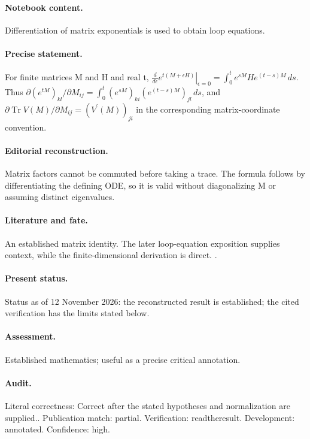 \paragraph{Notebook content.} Differentiation of matrix exponentials is used to obtain loop equations.

\paragraph{Precise statement.} For finite matrices M and H and real t, $\left.\frac{d}{d\epsilon}e^{t(M+\epsilon H)}\right|_{\epsilon=0}=\int_0^t e^{sM}He^{(t-s)M}\,ds$. Thus $\partial(e^{tM})_{kl}/\partial M_{ij}=\int_0^t(e^{sM})_{ki}(e^{(t-s)M})_{jl}\,ds$, and $\partial\operatorname{Tr}V(M)/\partial M_{ij}=(V^{\prime}(M))_{ji}$ in the corresponding matrix-coordinate convention.

\paragraph{Editorial reconstruction.} Matrix factors cannot be commuted before taking a trace. The formula follows by differentiating the defining ODE, so it is valid without diagonalizing M or assuming distinct eigenvalues.

\paragraph{Literature and fate.} An established matrix identity. The later loop-equation exposition supplies context, while the finite-dimensional derivation is direct. \citep{makeenko2000large}.

\paragraph{Present status.} Status as of 12 November 2026: the reconstructed result is established; the cited verification has the limits stated below.

\paragraph{Assessment.} Established mathematics; useful as a precise critical annotation.

\paragraph{Audit.} Literal correctness: Correct after the stated hypotheses and normalization are supplied.. Publication match: partial. Verification: readtheresult. Development: annotated. Confidence: high.

